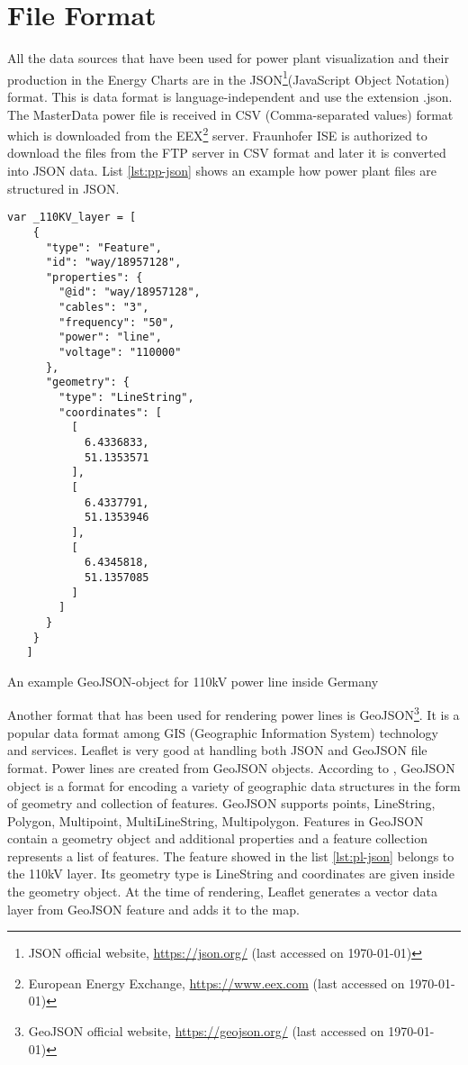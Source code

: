 \section{File Format}
\label{sec:fileFormat}

All the data sources that have been used for power plant visualization and their production in the Energy Charts are in the JSON\footnote{JSON official website, \url{https://json.org/} (last accessed on {\today})}(JavaScript Object Notation) format. This is data format is language-independent and use the extension .json. The MasterData power file is received in CSV (Comma-separated values) format which is downloaded from the EEX\footnote{European Energy Exchange, \url{https://www.eex.com} (last accessed on {\today})} server. Fraunhofer ISE is authorized to download the files from the FTP server in CSV format and later it is converted into JSON data. List \ref{lst:pp-json} shows an example how power plant files are structured in JSON. 

\begin{Listing}
\begin{lstlisting}
var _110KV_layer = [
    {
      "type": "Feature",
      "id": "way/18957128",
      "properties": {
        "@id": "way/18957128",
        "cables": "3",
        "frequency": "50",
        "power": "line",
        "voltage": "110000"
      },
      "geometry": {
        "type": "LineString",
        "coordinates": [
          [
            6.4336833,
            51.1353571
          ],
          [
            6.4337791,
            51.1353946
          ],
          [
            6.4345818,
            51.1357085
          ]
        ]
      }
    }
   ]
\end{lstlisting}
\caption{An example GeoJSON-object for 110kV power line inside Germany}
\label{lst:pl-json}
\end{Listing}

Another format that has been used for rendering power lines is GeoJSON\footnote{GeoJSON official website, \url{https://geojson.org/} (last accessed on {\today})}. It is a popular data format among GIS (Geographic Information System) technology and services. Leaflet is very good at handling both JSON and GeoJSON file format. Power lines are created from GeoJSON objects. According to \cite{geojson16}, GeoJSON object is a format for encoding a variety of geographic data structures in the form of geometry and collection of features. GeoJSON supports points, LineString, Polygon, Multipoint, MultiLineString, Multipolygon. Features in GeoJSON contain a geometry object and additional properties and a feature collection represents a list of features. The feature showed in the list \ref{lst:pl-json} belongs to the 110kV layer. Its geometry type is LineString and coordinates are given inside the geometry object. At the time of rendering, Leaflet generates a vector data layer from GeoJSON feature and adds it to the map.

